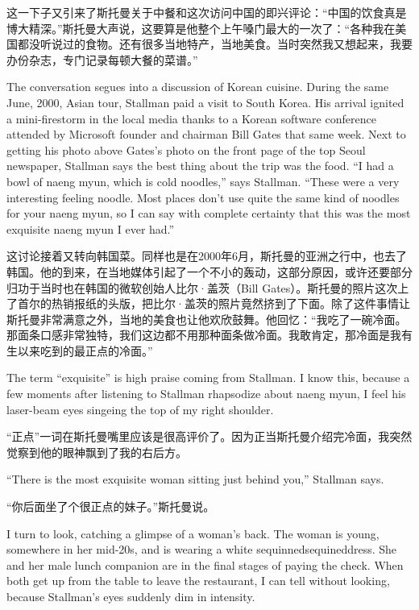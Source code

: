 \ifdefined\chs
这一下子又引来了斯托曼关于中餐和这次访问中国的即兴评论：``中国的饮食真是博大精深。''斯托曼大声说，这要算是他整个上午嗓门最大的一次了：``各种我在美国都没听说过的食物。还有很多当地特产，当地美食。当时突然我又想起来，我要办份杂志，专门记录每顿大餐的菜谱。''
\fi

\ifdefined\eng
The conversation segues into a discussion of Korean cuisine. During the same June, 2000, Asian tour, Stallman paid a visit to South Korea. His arrival ignited a mini-firestorm in the local media thanks to a Korean software conference attended by Microsoft founder and chairman Bill Gates that same week. Next to getting his photo above Gates's photo on the front page of the top Seoul newspaper, Stallman says the best thing about the trip was the food. ``I had a bowl of naeng myun, which is cold noodles,'' says Stallman. ``These were a very interesting feeling noodle. Most places don't use quite the same kind of noodles for your naeng myun, so I can say with complete certainty that this was the most exquisite naeng myun I ever had.''
\fi

\ifdefined\chs
这讨论接着又转向韩国菜。同样也是在2000年6月，斯托曼的亚洲之行中，也去了韩国。他的到来，在当地媒体引起了一个不小的轰动，这部分原因，或许还要部分归功于当时也在韩国的微软创始人比尔·盖茨（Bill Gates）。斯托曼的照片这次上了首尔的热销报纸的头版，把比尔·盖茨的照片竟然挤到了下面。除了这件事情让斯托曼非常满意之外，当地的美食也让他欢欣鼓舞。他回忆：``我吃了一碗冷面。那面条口感非常独特，我们这边都不用那种面条做冷面。我敢肯定，那冷面是我有生以来吃到的最正点的冷面。''
\fi

\ifdefined\eng
The term ``exquisite'' is high praise coming from Stallman. I know this, because a few moments after listening to Stallman rhapsodize about naeng myun, I feel his laser-beam eyes singeing the top of my right shoulder.
\fi

\ifdefined\chs
``正点''一词在斯托曼嘴里应该是很高评价了。因为正当斯托曼介绍完冷面，我突然觉察到他的眼神飘到了我的右后方。
\fi

\ifdefined\eng
``There is the most exquisite woman sitting just behind you,'' Stallman says.
\fi

\ifdefined\chs
``你后面坐了个很正点的妹子。''斯托曼说。
\fi

\ifdefined\eng
I turn to look, catching a glimpse of a woman's back. The woman is young, somewhere in her mid-20s, and is wearing a white \ifdefined\vone sequinned\fi\ifdefined\vtwo sequined\fi dress. She and her male lunch companion are in the final stages of paying the check. When both get up from the table to leave the restaurant, I can tell without looking, because Stallman's eyes suddenly dim in intensity.
\fi

